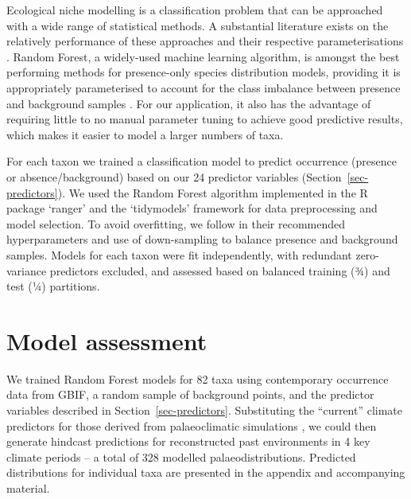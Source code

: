 \documentclass[
  authoryear,
  preprint]{elsarticle}
\begin{document}
Ecological niche modelling is a classification problem that can be
approached with a wide range of statistical methods. A substantial
literature exists on the relatively performance of these approaches and
their respective parameterisations \citep[reviewed
in][]{ValaviEtAl2022}. Random Forest, a widely-used machine learning
algorithm, is amongst the best performing methods for presence-only
species distribution models, providing it is appropriately parameterised
to account for the class imbalance between presence and background
samples \citep{ValaviEtAl2021, ValaviEtAl2022}. For our application, it
also has the advantage of requiring little to no manual parameter tuning
to achieve good predictive results, which makes it easier to model a
larger numbers of taxa.

For each taxon we trained a classification model to predict occurrence
(presence or absence/background) based on our 24 predictor variables
(Section~\ref{sec-predictors}). We used the Random Forest algorithm
implemented in the R package `ranger' \citep{WrightZiegler2017} and the
`tidymodels' \citep{tidymodels} framework for data preprocessing and
model selection. To avoid overfitting, we follow \citet{ValaviEtAl2021}
in their recommended hyperparameters and use of down-sampling to balance
presence and background samples. Models for each taxon were fit
independently, with redundant zero-variance predictors excluded, and
assessed based on balanced training (¾) and test (¼) partitions.

\section{Model assessment}\label{model-assessment}

We trained Random Forest models for 82 taxa using contemporary
occurrence data from GBIF, a random sample of background points, and the
predictor variables described in Section~\ref{sec-predictors}.
Substituting the ``current'' climate predictors for those derived from
palaeoclimatic simulations \citep{BrownEtAl2018}, we could then generate
hindcast predictions for reconstructed past environments in 4 key
climate periods -- a total of 328 modelled palaeodistributions.
Predicted distributions for individual taxa are presented in the
appendix and accompanying material.
\end{document}
